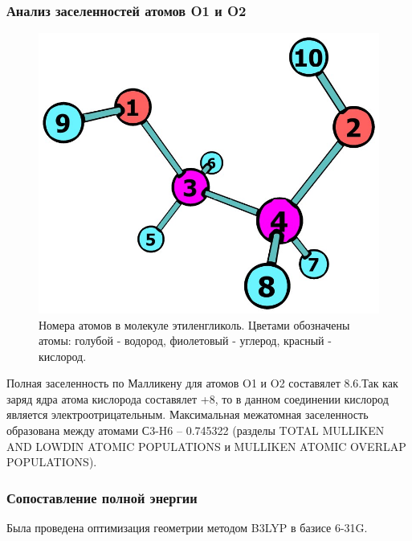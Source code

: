 \subsubsection*{Анализ заселенностей атомов O1 и O2}
\begin{figure}[H]
\centering
\captionsetup{justification=centering}
\includegraphics[scale=0.4]{fig/1.jpg}
\caption{Номера атомов в молекуле этиленгликоль. Цветами обозначены атомы: голубой - водород, фиолетовый - углерод, красный - кислород.}
\end{figure}

Полная заселенность по Малликену для атомов O1 и O2 составялет 8.6.Так как заряд ядра атома кислорода составялет +8, то в данном соединении кислород является электроотрицательным. Максимальная межатомная заселенность образована между атомами С3-H6 -- 0.745322 (разделы TOTAL MULLIKEN AND LOWDIN ATOMIC POPULATIONS и MULLIKEN ATOMIC OVERLAP POPULATIONS). 
\subsubsection*{Сопоставление полной энергии}
Была проведена оптимизация геометрии методом B3LYP в базисе 6-31G.

